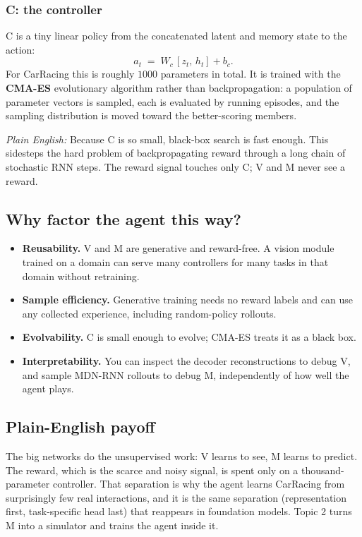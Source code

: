 \documentclass[11pt]{article}
\theoremstyle{remark}
\newcommand{\plain}[1]{\medskip\noindent\textit{Plain English:} #1\medskip}
\begin{document}
\subsubsection*{C: the controller}

C is a tiny linear policy from the concatenated latent and memory state to the action:
\begin{equation}
  a_t \;=\; W_c\,[z_t,\, h_t] + b_c .
  \label{eq:controller}
\end{equation}
For CarRacing this is roughly $1000$ parameters in total. It is trained with the \textbf{CMA-ES} evolutionary algorithm rather than backpropagation: a population of parameter vectors is sampled, each is evaluated by running episodes, and the sampling distribution is moved toward the better-scoring members.

\plain{Because C is so small, black-box search is fast enough. This sidesteps the hard problem of backpropagating reward through a long chain of stochastic RNN steps. The reward signal touches only C; V and M never see a reward.}

\subsection{Why factor the agent this way?}

\begin{itemize}[leftmargin=1.4em]
  \item \textbf{Reusability.} V and M are generative and reward-free. A vision module trained on a domain can serve many controllers for many tasks in that domain without retraining.
  \item \textbf{Sample efficiency.} Generative training needs no reward labels and can use any collected experience, including random-policy rollouts.
  \item \textbf{Evolvability.} C is small enough to evolve; CMA-ES treats it as a black box.
  \item \textbf{Interpretability.} You can inspect the decoder reconstructions to debug V, and sample MDN-RNN rollouts to debug M, independently of how well the agent plays.
\end{itemize}

\subsection*{Plain-English payoff}

The big networks do the unsupervised work: V learns to see, M learns to predict. The reward, which is the scarce and noisy signal, is spent only on a thousand-parameter controller. That separation is why the agent learns CarRacing from surprisingly few real interactions, and it is the same separation (representation first, task-specific head last) that reappears in foundation models. Topic 2 turns M into a simulator and trains the agent inside it.
\end{document}
